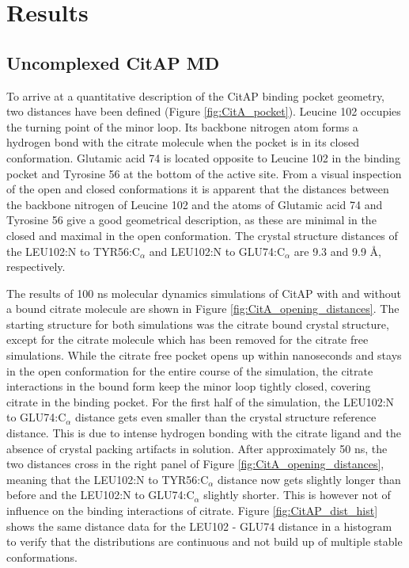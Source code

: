 \documentclass[english, a4paper, 12pt, titlepage, draft]{article}
\begin{document}

\section{Results}

\subsection{Uncomplexed CitAP MD}

To arrive at a quantitative description of the CitAP binding pocket geometry, two distances have been defined (Figure \ref{fig:CitA_pocket}).
Leucine 102 occupies the turning point of the minor loop.
Its backbone nitrogen atom forms a hydrogen bond with the citrate molecule when the pocket is in its closed conformation.
Glutamic acid 74 is located opposite to Leucine 102 in the binding pocket and Tyrosine 56 at the bottom of the active site.
From a visual inspection of the open and closed conformations it is apparent that the distances between the backbone nitrogen of Leucine 102 and the  atoms of Glutamic acid 74 and Tyrosine 56 give a good geometrical description, as these are minimal in the closed and maximal in the open conformation.
The crystal structure distances of the LEU102:N to TYR56:C$_{\alpha}$ and LEU102:N to GLU74:C$_{\alpha}$ are 9.3 and 9.9 \r{A}, respectively.

The results of 100 ns molecular dynamics simulations of CitAP with and without a bound citrate molecule are shown in Figure \ref{fig:CitA_opening_distances}.
The starting structure for both simulations was the citrate bound crystal structure, except for the citrate molecule which has been removed for the citrate free simulations.
While the citrate free pocket opens up within nanoseconds and stays in the open conformation for the entire course of the simulation, the citrate interactions in the bound form keep the minor loop tightly closed, covering citrate in the binding pocket.
For the first half of the simulation, the LEU102:N to GLU74:C$_{\alpha}$ distance gets even smaller than the crystal structure reference distance.
This is due to intense hydrogen bonding with the citrate ligand and the absence of crystal packing artifacts in solution.
After approximately 50 ns, the two distances cross in the right panel of Figure \ref{fig:CitA_opening_distances}, meaning that the LEU102:N to TYR56:C$_{\alpha}$ distance now gets slightly longer than before and the LEU102:N to GLU74:C$_{\alpha}$ slightly shorter.
This is however not of influence on the binding interactions of citrate.
Figure \ref{fig:CitAP_dist_hist} shows the same distance data for the LEU102 - GLU74 distance in a histogram to verify that the distributions are continuous and not build up of multiple stable conformations.
\end{document}
